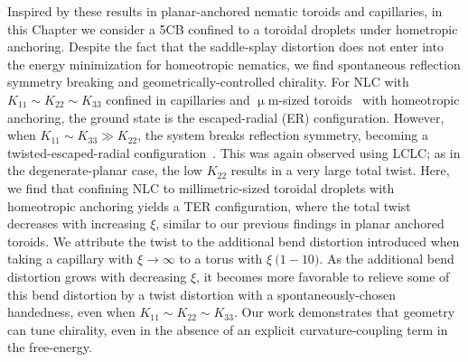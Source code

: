 Inspired by these results in planar-anchored nematic toroids and capillaries, in this Chapter we consider a 5CB confined to a toroidal droplets under hometropic anchoring.
Despite the fact that the saddle-splay distortion does not enter into the energy minimization for homeotropic nematics, we find spontaneous reflection symmetry breaking and geometrically-controlled chirality.
For NLC with $K_{11}\sim K_{22} \sim K_{33}$ confined in capillaries and $\upmu$m-sized toroids~\cite{RN274} with homeotropic anchoring, the ground state is the escaped-radial (ER) configuration.
However, when $K_{11}\sim K_{33} \gg K_{22}$, the system breaks reflection symmetry, becoming a twisted-escaped-radial configuration~\cite{RN192}.
This was again observed using LCLC; as in the degenerate-planar case, the low $K_{22}$ results in a very large total twist.
Here, we find that confining NLC to millimetric-sized toroidal droplets with homeotropic anchoring yields a TER configuration, where the total twist decreases with increasing $\xi$, similar to our previous findings in planar anchored toroids.
We attribute the twist to the additional bend distortion introduced when taking a capillary with $\xi \rightarrow \infty$ to a torus with $\xi ~\mathcal(1-10)$.
As the additional bend distortion grows with decreasing $\xi$, it becomes more favorable to relieve some of this bend distortion by a twist distortion with a spontaneously-chosen handedness, even when $K_{11}\sim K_{22} \sim K_{33}$.
Our work demonstrates that geometry can tune chirality, even in the absence of an explicit curvature-coupling term in the free-energy.

